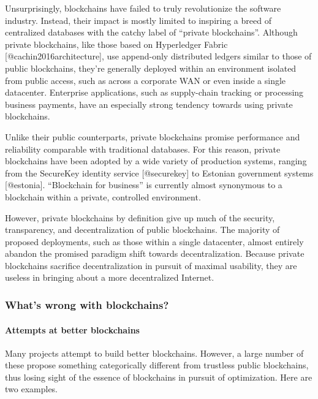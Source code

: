 \documentclass[]{article}
\let\oldparagraph\paragraph
\renewcommand{\paragraph}[1]{\oldparagraph{#1}\mbox{}}
\begin{document}
Unsurprisingly, blockchains have failed to truly revolutionize the
software industry. Instead, their impact is mostly limited to inspiring
a breed of centralized databases with the catchy label of ``private
blockchains''. Although private blockchains, like those based on
Hyperledger Fabric {[}@cachin2016architecture{]}, use append-only
distributed ledgers similar to those of public blockchains, they're
generally deployed within an environment isolated from public access,
such as across a corporate WAN or even inside a single datacenter.
Enterprise applications, such as supply-chain tracking or processing
business payments, have an especially strong tendency towards using
private blockchains.

Unlike their public counterparts, private blockchains promise
performance and reliability comparable with traditional databases. For
this reason, private blockchains have been adopted by a wide variety of
production systems, ranging from the SecureKey identity service
{[}@securekey{]} to Estonian government systems {[}@estonia{]}.
``Blockchain for business'' is currently almost synonymous to a
blockchain within a private, controlled environment.

However, private blockchains by definition give up much of the security,
transparency, and decentralization of public blockchains. The majority
of proposed deployments, such as those within a single datacenter,
almost entirely abandon the promised paradigm shift towards
decentralization. Because private blockchains sacrifice decentralization
in pursuit of maximal usability, they are useless in bringing about a
more decentralized Internet.

\hypertarget{whats-wrong-with-blockchains}{%
\subsubsection{What's wrong with
blockchains?}\label{whats-wrong-with-blockchains}}

\hypertarget{attempts-at-better-blockchains}{%
\paragraph{Attempts at better
blockchains}\label{attempts-at-better-blockchains}}

Many projects attempt to build better blockchains. However, a large
number of these propose something categorically different from trustless
public blockchains, thus losing sight of the essence of blockchains in
pursuit of optimization. Here are two examples.
\end{document}
